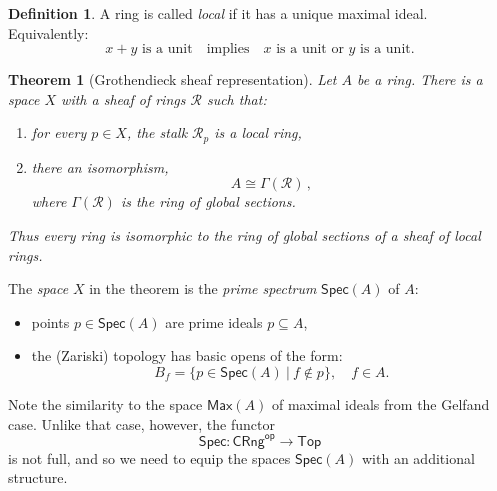 \documentclass[12pt]{article}
\newtheorem*{theorem*}{Theorem}
\theoremstyle{remark}
\theoremstyle{definition}
\newtheorem*{definition*}{Definition}
\newcommand{\myemph}[1]{\emph{#1}}
\begin{document}

\begin{definition*} A  ring is called \emph{local} if it has a unique maximal ideal. \\
Equivalently: 
\begin{equation}\label{eq:localring}
\text{$x+y$ is a unit}\quad\text{implies}\quad\text{$x$ is a unit or $y$ is a unit}.
\end{equation}
\end{definition*}
%
\begin{theorem*}[Grothendieck sheaf representation]
Let $A$ be a ring.  There is a space $X$ with a sheaf of rings $\mathcal{R}$ such that:
\begin{enumerate}
\item for every $p\in X$, the stalk $\mathcal{R}_p$ is a local ring, 
\item there an isomorphism, $$A\cong \Gamma(\mathcal{R})\,,$$
where $\Gamma(\mathcal{R})$ is the ring of global sections.
\end{enumerate}
Thus every ring is isomorphic to the ring of global sections of a sheaf of local rings.
\end{theorem*}


The \myemph{space} $X$ in the theorem is the \emph{prime spectrum} $\mathsf{Spec}(A)$ of $A$:
 \begin{itemize}
\item points $p\in \mathsf{Spec}(A)$ are prime ideals $p\subseteq A$,
\item the (Zariski) topology has basic opens of the form:
 $$B_f = \{ p\in \mathsf{Spec}(A)\ |\ f\not\in p \}, \quad f\in A.$$
\end{itemize}
Note the similarity to the space $\mathsf{Max}(A)$ of maximal ideals from the Gelfand case.  
Unlike that case, however, the functor 
\[
\mathsf{Spec} : \mathsf{CRng}^\mathsf{op} \to \mathsf{Top}
 \]
is not full, and so we need to equip the spaces  $\mathsf{Spec}(A)$ with an additional structure.
\end{document}
